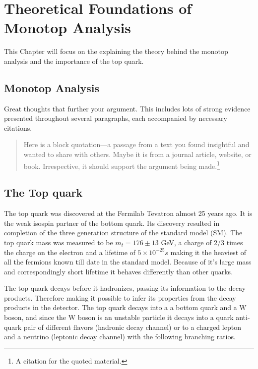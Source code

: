 \chapter{Theoretical Foundations of Monotop Analysis}
\label{chapter:four}
This Chapter will focus on the explaining the theory behind the monotop analysis and the importance of the top quark.
\section{Monotop Analysis}

Great thoughts that further your argument. This includes lots of strong evidence presented throughout several paragraphs, each accompanied by necessary citations.
\begin{quotation}
    \noindent Here is a block quotation---a passage from a text you found insightful and wanted to share with others. Maybe it is from a journal article, website, or book. Irrespective, it should support the argument being made.\footnote{A citation for the quoted material.}
\end{quotation}



\section{The Top quark}

The top quark was discovered at the Fermilab Tevatron almost 25 years ago. It is the weak isospin partner of the bottom quark. Its discovery resulted in completion of the three generation structure of the standard model (SM). The top quark mass was measured to be $m_{t} = 176 \pm 13$ GeV, a charge of 2/3 times the charge on the electron and a lifetime of $5 \times 10^{-25} s$ making it the heaviest of all the fermions known till date in the standard model. Because of it's large mass and correspondingly short lifetime it behaves differently than other quarks. 

The top quark decays before it hadronizes, passing its information to the decay products. Therefore making it possible to infer its properties from the decay products in the detector. The top quark decays into a a bottom quark and a W boson, and since the W boson is an unstable particle it decays into a quark anti-quark pair of different flavors (hadronic decay channel) or to a charged lepton and a neutrino (leptonic decay channel) with the following branching ratios.

